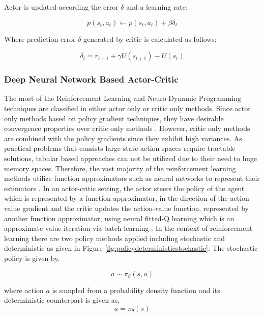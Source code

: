 \documentclass{ituphdreport}
\begin{document}
Actor is updated according the error $\delta$ and a learning rate:

\begin{equation}
\label{eq:acactorupdate}
p(s_{t}, a_{t}) \leftarrow p(s_{t}, a_{t}) + \beta \delta_{t}
\end{equation}

Where prediction error $\delta$ generated by critic is calculated as follows:

\begin{equation}
\label{eq:acdeltaerror}
\delta_{t} = r_{t+1} + \gamma U(s_{t+1}) - U(s_{t})
\end{equation}



\subsubsection{Deep Neural Network Based Actor-Critic} \label{sec:actorcriticdnn}
The most of the Reinforcement Learning and Neuro Dynamic Programming techniques are classified in either actor only or critic only methods. Since actor only methods based on policy gradient techniques, they have desirable convergence properties over critic only methods \cite{konda2000actor}. However, critic only methods are combined with the policy gradients since they exhibit high variances. As practical problems that consists large state-action spaces require tractable solutions, tabular based approaches can not be utilized due to their need to huge memory spaces. Therefore, the vast majority of the reinforcement learning methods utilize function approximators such as neural networks to represent their estimators \cite{mnih2016asynchronous}. In an actor-critic setting, the actor steers the policy of the agent which is represented by a function approximator, in the direction of the action-value gradient and the critic updates the action-value function, represented by another function approximator, using neural fitted-Q learning which is an approximate value iteration via batch learning \cite{silver2014deterministic}. In the context of reinforcement learning there are two policy methods applied including stochastic and deterministic as given in Figure \ref{fig:policydeterministicstochastic}. The stochastic policy is given by,

\begin{equation}
\label{eq:abc}
a\sim\pi_\theta(s,a)
\end{equation}

where action $a$ is sampled from a probability density function and its deterministic counterpart is given as,
\begin{equation}
\label{eq:abc}
a=\pi_\theta(s) 
\end{equation}
\end{document}
